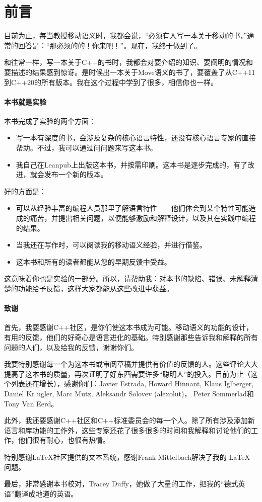 \chapter{前言}

目前为止，每当教授移动语义时，我都会说，“必须有人写一本关于移动的书，”通常的回答是：“那必须的的！你来吧！”。现在，我终于做到了。

和往常一样，写一本关于C++的书时，我都会对要介绍的知识、要阐明的情况和要描述的结果感到惊讶。是时候出一本关于Move语义的书了，要覆盖了从C++11到C++20的所有版本。我在这个过程中学到了很多，相信你也一样。

\subsubsection{本书就是实验}

本书完成了实验的两个方面：
\begin{itemize}
	\item 写一本有深度的书，会涉及复杂的核心语言特性，还没有核心语言专家的直接帮助。不过，我可以通过问问题来写这本书。
	\item 我自己在Leanpub上出版这本书，并按需印刷。这本书是逐步完成的，有了改进，就会发布一个新的版本。
\end{itemize}

好的方面是：
\begin{itemize}
	\item 可以从经验丰富的编程人员那里了解语言特性——他们体会到某个特性可能造成的痛苦，并提出相关问题，以便能够激励和解释设计，以及其在实践中编程的结果。
	\item 当我还在写作时，可以阅读我的移动语义经验，并进行借鉴。
	\item 这本书和所有的读者都能从您的早期反馈中受益。
\end{itemize}

这意味着你也是实验的一部分。所以，请帮助我：对本书的缺陷、错误、未解释清楚的功能给予反馈，这样大家都能从这些改进中获益。

\subsubsection{致谢}

首先，我要感谢C++社区，是你们使这本书成为可能。移动语义的功能的设计，有用的反馈，他们的好奇心是语言进化的基础。特别感谢那些告诉我和解释的所有问题的人们，以及给我的反馈，谢谢你们。

我要特别感谢每一个为这本书或审阅草稿并提供有价值的反馈的人。这些评论大大提高了这本书的质量，再次证明了好东西需要许多“聪明人”的投入。目前为止（这个列表还在增长），感谢你们：Javier Estrada, Howard Hinnant, Klaus Iglberger, Daniel Kr ugler, Marc Mutz, Aleksandr Solovev (alexolut)， Peter Sommerlad和Tony Van Eerd。

此外，我还要感谢C++社区和C++标准委员会的每一个人。除了所有涉及添加新语言和库功能的工作外，这些专家还花了很多很多的时间和我解释和讨论他们的工作，他们很有耐心，也很有热情。

特别感谢LaTeX社区提供的文本系统，感谢Frank Mittelbach解决了我的 \LaTeX{} 问题。

最后，非常感谢本书校对，Tracey Duffy，她做了大量的工作，把我的“德式英语”翻译成地道的英语。


















